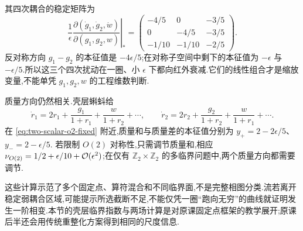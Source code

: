其四次耦合的稳定矩阵为
\begin{equation}
 \frac1\epsilon\left.\frac{\partial(\dot g_1,\dot g_2,\dot w)}
        {\partial(g_1,g_2,w)}\right|_*
 =\begin{pmatrix}-4/5&0&-3/5\\0&-4/5&-3/5\\-1/10&-1/10&-2/5\end{pmatrix}.
\end{equation}
反对称方向 $g_1-g_2$ 的本征值是 $-4\epsilon/5$;在对称子空间中剩下的本征值为 $-\epsilon$ 与 $-\epsilon/5$.所以这三个四次扰动在一圈、小 $\epsilon$ 下都向红外衰减.它们的线性组合才是缩放变量,不能单凭 $g_1,g_2,w$ 的工程维数判断.

质量方向仍然相关.壳层蝌蚪给
\begin{equation}
 \dot r_1=2r_1+\frac{g_1}{1+r_1}+\frac w{1+r_2}+\cdots,
 \qquad
 \dot r_2=2r_2+\frac{g_2}{1+r_2}+\frac w{1+r_1}+\cdots.
\end{equation}
在 \eqref{eq:two-scalar-o2-fixed} 附近,质量和与质量差的本征值分别为
$y_+=2-2\epsilon/5$、$y_-=2-\epsilon/5$.
若限制 $O(2)$ 对称性,只需调节质量和,相应
$\nu_{O(2)}=1/2+\epsilon/10+\mathcal O(\epsilon^2)$;在仅有 $\mathbb Z_2\times\mathbb Z_2$ 的多临界问题中,两个质量方向都需要调节.

这些计算示范了多个固定点、算符混合和不同临界面,不是完整相图分类.流若离开稳定弱耦合区域,可能提示所选截断不足,不能仅凭一圈“跑向无穷”的曲线就证明发生一阶相变.本节的壳层临界指数与两场计算是对原课固定点框架的教学展开;原课后半还会用传统重整化方案得到相同的尺度信息.
